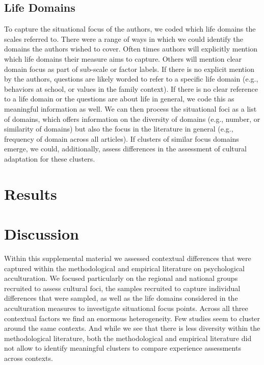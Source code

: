 \documentclass[man, 12pt, a4paper]{apa7}
\begin{document}
\subsection{Life Domains}
To capture the situational focus of the authors, we coded which life domains the scales referred to. There were a range of ways in which we could identify the domains the authors wished to cover. Often times authors will explicitly mention which life domains their measure aims to capture. Others will mention clear domain focus as part of sub-scale or factor labels. If there is no explicit mention by the authors, questions are likely worded to refer to a specific life domain (e.g., behaviors at school, or values in the family context). If there is no clear reference to a life domain or the questions are about life in general, we code this as meaningful information as well. We can then process the situational foci as a list of domains, which offers information on the diversity of domains (e.g., number, or similarity of domains) but also the focus in the literature in general (e.g., frequency of domain across all articles). If clusters of similar focus domains emerge, we could, additionally, assess differences in the assessment of cultural adaptation for these clusters.

\section{Results}


\section{Discussion}
Within this supplemental material we assessed contextual differences that were captured within the methodological and empirical literature on psychological acculturation. We focused particularly on the regional and national groups recruited to assess cultural foci, the samples recruited to capture individual differences that were sampled, as well as the life domains considered in the acculturation measures to investigate situational focus points. Across all three contextual factors we find an enormous heterogeneity. Few studies seem to cluster around the same contexts. And while we see that there is less diversity within the methodological literature, both the methodological and empirical literature did not allow to identify meaningful clusters to compare experience assessments across contexts.

\printbibliography
\end{document}
